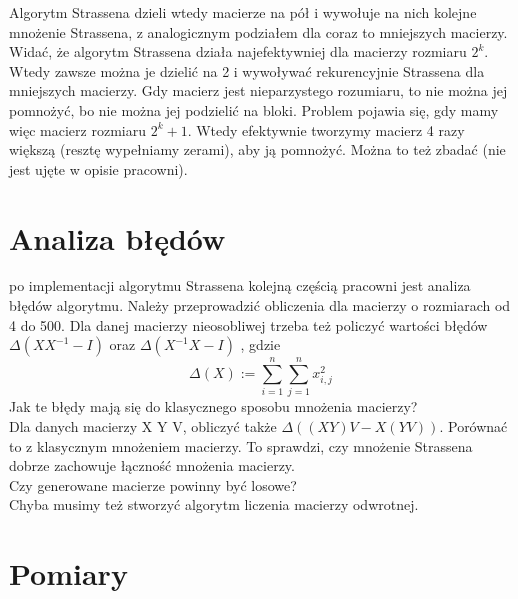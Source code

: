 \documentclass[paper=a4, fontsize=11pt]{scrartcl} %
\numberwithin{equation}{section} %
\numberwithin{figure}{section} %
\numberwithin{table}{section} %
\begin{document}
Algorytm Strassena dzieli wtedy macierze na pół i wywołuje na nich kolejne mnożenie Strassena, z analogicznym podziałem dla coraz to mniejszych macierzy. \\

Widać, że algorytm Strassena działa najefektywniej dla macierzy rozmiaru 
${2^k}$. Wtedy zawsze można je dzielić na 2 i wywoływać rekurencyjnie Strassena dla mniejszych macierzy. Gdy macierz jest nieparzystego rozumiaru, to nie można jej pomnożyć, bo nie można jej podzielić na bloki. Problem pojawia się, gdy mamy więc macierz rozmiaru 
${2^k+1}$. Wtedy efektywnie tworzymy macierz 4 razy większą (resztę wypełniamy zerami), aby ją pomnożyć. Można to też zbadać (nie jest ujęte w opisie pracowni).


\section{Analiza błędów}
po implementacji algorytmu Strassena kolejną częścią pracowni jest analiza błędów algorytmu.
Należy przeprowadzić obliczenia dla macierzy o rozmiarach od 4 do 500. Dla danej macierzy nieosobliwej trzeba też policzyć wartości błędów 
$\Delta(X X^{-1} - I)$ oraz $\Delta(X^{-1}X - I)$ , gdzie 
$${\Delta(X) := \sum_{i=1}^n \sum_{j=1}^n x_{i,j}^2 }$$ 
Jak te błędy mają się do klasycznego sposobu mnożenia macierzy?\\




Dla danych macierzy X Y V, obliczyć także ${\Delta((X Y)V - X(Y V))}$. Porównać to z klasycznym mnożeniem macierzy. To sprawdzi, czy mnożenie Strassena dobrze zachowuje łączność mnożenia macierzy.\\

Czy generowane macierze powinny być losowe?\\
Chyba musimy też stworzyć algorytm liczenia macierzy odwrotnej.

\section{Pomiary}
\end{document}
